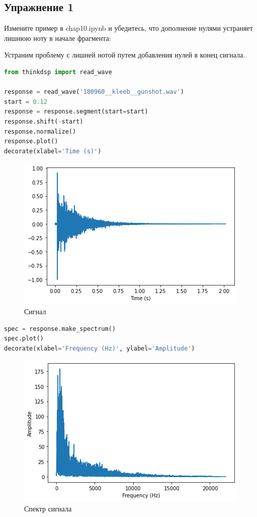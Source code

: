 \subsection{Упражнение 1}

Измените пример в chap10.ipynb и убедитесь, что дополнение нулями устраняет лишнюю ноту в начале фрагмента:

Устраним проблему с лишней нотой путем добавления нулей в конец сигнала.

\begin{lstlisting}[language=Python]
from thinkdsp import read_wave

response = read_wave('180960__kleeb__gunshot.wav')
start = 0.12
response = response.segment(start=start)
response.shift(-start)
response.normalize()
response.plot()
decorate(xlabel='Time (s)')
\end{lstlisting}
\begin{figure}[H]
	\begin{center}
		\includegraphics[scale=1]{fig/lab10/lab10_1.png}
		\caption{Сигнал}
	\end{center}
\end{figure}

\begin{lstlisting}[language=Python]
spec = response.make_spectrum()
spec.plot()
decorate(xlabel='Frequency (Hz)', ylabel='Amplitude')
\end{lstlisting}
\begin{figure}[H]
	\begin{center}
		\includegraphics[scale=1]{fig/lab10/lab10_2.png}
		\caption{Спектр сигнала}
	\end{center}
\end{figure}

